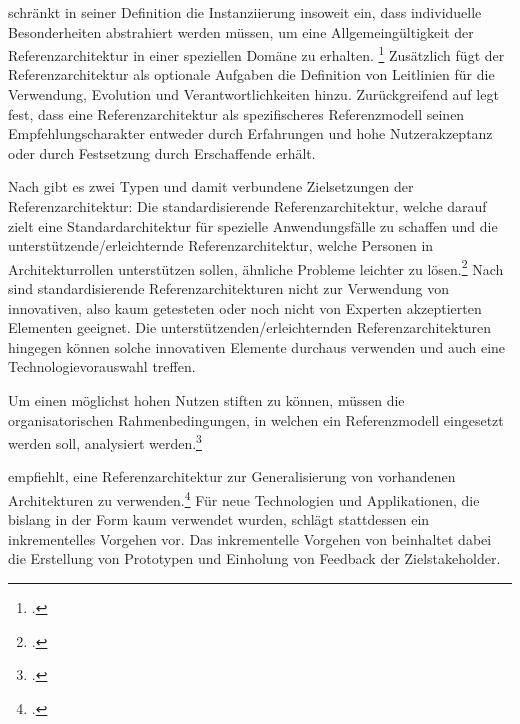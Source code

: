 \citeauthor{Trefke.2012} schränkt in seiner Definition die Instanziierung insoweit ein, dass individuelle Besonderheiten abstrahiert werden müssen, um eine Allgemeingültigkeit der Referenzarchitektur in einer speziellen Domäne zu erhalten.  \footcite[Vgl. auch im Folgenden][]{Trefke.2012} Zusätzlich fügt \citeauthor{Trefke.2012} der Referenzarchitektur als optionale Aufgaben die Definition von Leitlinien für die Verwendung, Evolution und Verantwortlichkeiten hinzu. Zurückgreifend auf \citeauthor{vomBrocke.2003} legt \citeauthor{Trefke.2012} fest, dass eine Referenzarchitektur als spezifischeres Referenzmodell seinen Empfehlungscharakter entweder durch Erfahrungen und hohe Nutzerakzeptanz oder durch Festsetzung durch Erschaffende erhält.

Nach \citeauthor{Angelov.2012} gibt es zwei Typen und damit verbundene Zielsetzungen der Referenzarchitektur: Die standardisierende Referenzarchitektur, welche darauf zielt eine Standardarchitektur für spezielle Anwendungsfälle zu schaffen und die unterstützende/erleichternde Referenzarchitektur, welche Personen in Architekturrollen unterstützen sollen, ähnliche Probleme leichter zu lösen.\footcite[Vgl. auch im Folgenden][S.~422~ff.]{Angelov.2012} Nach \citeauthor{Angelov.2012} sind standardisierende Referenzarchitekturen nicht zur Verwendung von innovativen, also kaum getesteten oder noch nicht von Experten akzeptierten Elementen geeignet. Die unterstützenden/erleichternden Referenzarchitekturen hingegen können solche innovativen Elemente durchaus verwenden und auch eine Technologievorauswahl treffen.

Um einen möglichst hohen Nutzen stiften zu können, müssen die organisatorischen Rahmenbedingungen, in welchen ein Referenzmodell eingesetzt werden soll, analysiert werden.\footcite[Vgl.][]{vomBrocke.2004}

\citeauthor{Muller.2020} empfiehlt, eine Referenzarchitektur zur Generalisierung von vorhandenen Architekturen zu verwenden.\footcite[Vgl. auch im Folgenden][7]{Muller.2020} Für neue Technologien und Applikationen, die bislang in der Form kaum verwendet wurden, schlägt \citeauthor{Muller.2020} stattdessen ein inkrementelles Vorgehen vor. Das inkrementelle Vorgehen von \citeauthor{Muller.2020} beinhaltet dabei die Erstellung von Prototypen und Einholung von Feedback der Zielstakeholder. 


